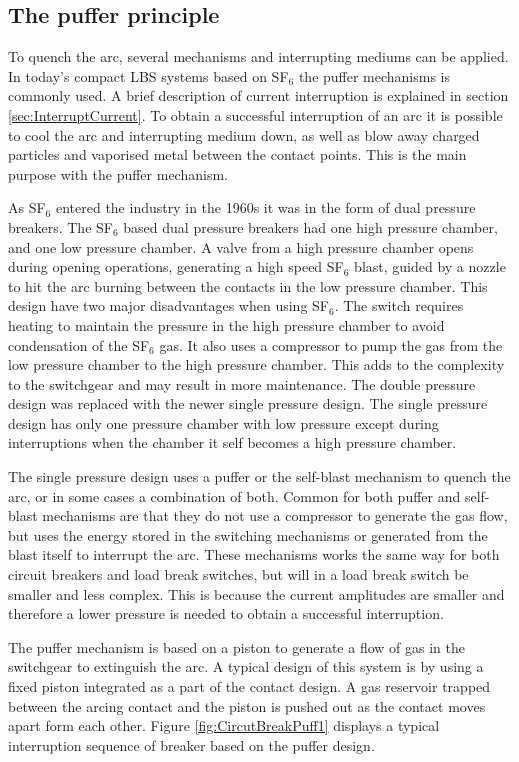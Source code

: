 \documentclass[10pt,a4paper]{article} %
\begin{document}
\subsection{The puffer principle}
To quench the arc, several mechanisms and interrupting mediums can be applied. In today's compact LBS systems based on SF$_6$ the puffer mechanisms is commonly used. A brief description of current interruption is explained in section \ref{sec:InterruptCurrent}. To obtain a successful interruption of an arc it is possible to cool the arc and interrupting medium down, as well as blow away charged particles and vaporised metal between the contact points. This is the main purpose with the puffer mechanism. 

As SF$_6$ entered the industry in the 1960s it was in the form of dual pressure breakers. The SF$_6$ based dual pressure breakers had one high pressure chamber, and one low pressure chamber. A valve from a high pressure chamber opens during opening operations, generating a high speed SF$_6$ blast, guided by a nozzle to hit the arc burning between the contacts in the low pressure chamber. This design have two major disadvantages when using SF$_6$. The switch requires heating to maintain the pressure in the high pressure chamber to avoid condensation of the SF$_6$ gas. It also uses a compressor to pump the gas from the low pressure chamber to the high pressure chamber. This adds to the complexity to the switchgear and may result in more maintenance. The double pressure design was replaced with the newer single pressure design. The single pressure design has only one pressure chamber with low pressure except during interruptions when the chamber it self becomes a high pressure chamber.

The single pressure design uses a puffer or the self-blast mechanism to quench the arc, or in some cases a combination of both. Common for both puffer and self-blast mechanisms are that they do not use a compressor to generate the gas flow, but uses the energy stored in the switching mechanisms or generated from the blast itself to interrupt the arc. These mechanisms works the same way for both circuit breakers and load break switches, but will in a load break switch be smaller and less complex. This is because the current amplitudes are smaller and therefore a lower pressure is needed to obtain a successful interruption.

The puffer mechanism is based on a piston to generate a flow of gas in the switchgear to extinguish the arc. A typical design of this system is by using a fixed piston integrated as a part of the contact design. A gas reservoir trapped between the arcing contact and the piston is pushed out as the contact moves apart form each other. Figure \ref{fig:CircutBreakPuff1} displays a typical interruption sequence of breaker based on the puffer design.
\end{document}
